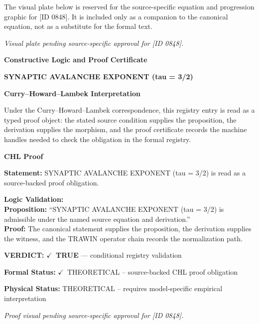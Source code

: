 \begingroup\footnotesize\sloppy
The visual plate below is reserved for the source-specific equation and progression graphic for [ID 0848]. It is included only as a companion to the canonical equation, not as a substitute for the formal text.
\par\endgroup
\begingroup\footnotesize\itshape
Visual plate pending source-specific approval for [ID 0848].
\par\endgroup

\clearpage
\begingroup\tzpsupportsetup
\noindent\textbf{\fontsize{10.8pt}{12.8pt}\selectfont [ID 0848] Constructive Logic and Proof Certificate}\par
\noindent\textbf{\fontsize{10pt}{12pt}\selectfont SYNAPTIC AVALANCHE EXPONENT (tau = 3/2)}\par
\vspace{0.45em}
\begingroup
\footnotesize
\setlength{\parskip}{0.22em}
\setlength{\parindent}{0pt}
\noindent\textbf{Curry--Howard--Lambek Interpretation}\par
Under the Curry--Howard--Lambek correspondence, this registry entry is read as a typed proof
object: the stated source condition supplies the proposition, the derivation supplies the
morphism, and the proof certificate records the machine handles needed to check the obligation
in the formal registry.

\vspace{0.45em}
\noindent\textbf{CHL Proof}\par
\textbf{Statement:} SYNAPTIC AVALANCHE EXPONENT (tau = 3/2) is read as a source-backed proof obligation.

\textbf{Logic Validation:}\\
\textbf{Proposition:} ``SYNAPTIC AVALANCHE EXPONENT (tau = 3/2) is admissible under the named source equation and derivation.''\\
\textbf{Proof:} The canonical statement supplies the proposition, the derivation supplies the witness, and the TRAWIN operator chain records the normalization path.

\textbf{VERDICT:} \ensuremath{\checkmark}\ \textbf{TRUE} --- conditional registry validation

\textbf{Formal Status:} \ensuremath{\checkmark}\ THEORETICAL -- source-backed CHL proof obligation

\textbf{Physical Status:} THEORETICAL -- requires model-specific empirical interpretation
\par\vspace{0.45em}
\par
\vfill
\begingroup\footnotesize\itshape
Proof visual pending source-specific approval for [ID 0848].
\par\endgroup
\vfill
\endgroup
\endgroup
